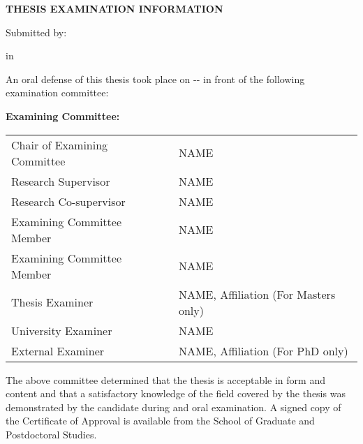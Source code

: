 
\cleardoublepage
\thispagestyle{plain}

\begin{center}
\textbf{THESIS EXAMINATION INFORMATION}

\bigskip

Submitted by:  \makeatletter\textbf{\@firstname\ {\@lastname}}\makeatother

\bigskip
\bigskip

\textbf{\degree} in \textbf{\program}

\end{center}


\bigskip
\bigskip

\noindent {}

\bigskip

An oral defense of this thesis took place on -\degreemonth-\degreeyear{} in front of the following examination committee:

\medskip

\noindent\textbf{Examining Committee:}

\bigskip

\begingroup
\renewcommand{\arraystretch}{2}
\begin{tabular}{lcl}
    Chair of Examining Committee &\phantom{Alphabet}& NAME \\
    Research Supervisor && NAME\\
    Research Co-supervisor && NAME \\
    Examining Committee Member && NAME \\
    Examining Committee Member && NAME \\
    Thesis Examiner && NAME, Affiliation (For Masters only)\\
    University Examiner && NAME \\
    External Examiner && NAME, Affiliation (For PhD only)\\
\end{tabular}
\endgroup

\medskip

\noindent The above committee determined that the thesis is acceptable in form and content and that a satisfactory knowledge of the field covered by the thesis was demonstrated by the candidate during and oral examination. A signed copy of the Certificate of Approval is available from the School of Graduate and Postdoctoral Studies.



